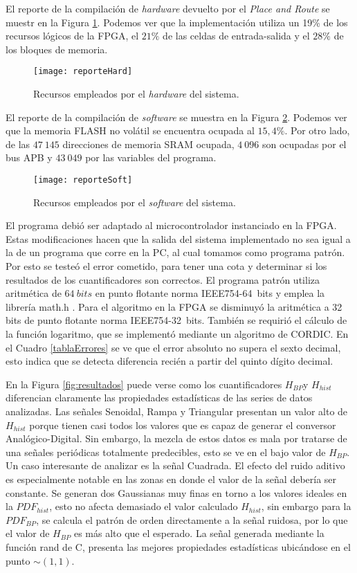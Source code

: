 El reporte de la compilación de \textit{hardware} devuelto por el \textit{Place and Route} se muestr en la Figura \ref{fig:hard}. Podemos ver que la implementación utiliza un 19\% de los recursos lógicos de la FPGA, el $21\%$ de las celdas de entrada-salida y el $28\%$ de los bloques de memoria.
%
\begin{figure}[htb]
	\centering\texttt{[image: reporteHard]}
	\caption{Recursos empleados por el \textit{hardware} del sistema.}\label{fig:hard}
\end{figure}

El reporte de la compilación de \textit{software} se muestra en la Figura \ref{fig:soft}.
Podemos ver que la memoria FLASH no volátil se encuentra ocupada al $15,4\%$.
Por otro lado, de las $47~145$ direcciones de memoria SRAM ocupada, $4~096$ son ocupadas por el bus APB y $43~049$ por las variables del programa.
%
\begin{figure}[htb]
	\centering\texttt{[image: reporteSoft]}
	\caption{Recursos empleados por el \textit{software} del sistema.}\label{fig:soft}
\end{figure}

El programa debió ser adaptado al microcontrolador instanciado en la FPGA.
Estas modificaciones hacen que la salida del sistema implementado no sea igual a la de un programa que corre en la PC, al cual tomamos como programa patrón.
Por esto se testeó el error cometido, para tener una cota y determinar si los resultados de los cuantificadores son correctos.
El programa patrón utiliza aritmética de $64~bits$ en punto flotante norma IEEE754-64~bits y emplea la librería math.h \cite{Mathe}.
Para el algoritmo en la FPGA se disminuyó la aritmética a 32 bits de punto flotante norma IEEE754-32~bits.
También se requirió el cálculo de la función logaritmo, que se implementó mediante un algoritmo de CORDIC.
En el Cuadro \ref{tablaErrores} se ve que el error absoluto no supera el sexto decimal, esto indica que se detecta diferencia recién a partir del quinto dígito decimal.

En la Figura \ref{fig:resultados} puede verse como los cuantificadores $H_{BP}$y $H_{hist}$ diferencian claramente las propiedades estadísticas de las series de datos analizadas.
Las señales Senoidal, Rampa y Triangular presentan un valor alto de $H_{hist}$ porque tienen casi todos los valores que es capaz de generar el conversor Analógico-Digital.
Sin embargo, la mezcla de estos datos es mala por tratarse de una señales periódicas totalmente predecibles, esto se ve en el bajo valor de $H_{BP}$.
Un caso interesante de analizar es la señal Cuadrada.
El efecto del ruido aditivo es especialmente notable en las zonas en donde el valor de la señal debería ser constante.
Se generan dos Gaussianas muy finas en torno a los valores ideales en la $PDF_{hist}$, esto no afecta demasiado el valor calculado $H_{hist}$, sin embargo para la $PDF_{BP}$, se calcula el patrón de orden directamente a la señal ruidosa, por lo que el valor de $H_{BP}$ es más alto que el esperado.
La señal generada mediante la función rand de C, presenta las mejores propiedades estadísticas ubicándose en el punto $\sim(1,1)$.